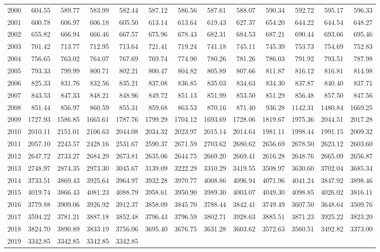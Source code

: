 \begin{longtable}{rrrrrrrrrrrrr}
  2000 & 604.55 & 589.77 & 583.99 & 582.44 & 587.12 & 586.56 & 587.61 & 588.07 & 590.34 & 592.72 & 595.17 & 596.33 \\ 
  2001 & 600.78 & 606.97 & 606.18 & 605.50 & 613.14 & 613.64 & 619.43 & 627.37 & 654.20 & 644.22 & 644.54 & 648.27 \\ 
  2002 & 655.82 & 666.94 & 666.46 & 667.57 & 675.96 & 678.43 & 682.31 & 684.53 & 687.21 & 690.44 & 693.66 & 695.46 \\ 
  2003 & 701.42 & 713.77 & 712.95 & 713.64 & 721.41 & 719.24 & 741.18 & 745.11 & 745.39 & 753.73 & 754.69 & 752.83 \\ 
  2004 & 756.65 & 763.02 & 764.07 & 767.69 & 769.74 & 774.90 & 780.26 & 781.26 & 786.03 & 791.92 & 793.51 & 787.98 \\ 
  2005 & 793.33 & 799.99 & 800.71 & 802.21 & 800.47 & 804.82 & 805.89 & 807.66 & 811.87 & 816.12 & 816.81 & 814.98 \\ 
  2006 & 825.33 & 831.76 & 832.56 & 835.21 & 837.08 & 836.85 & 835.03 & 834.63 & 834.30 & 837.87 & 840.40 & 837.71 \\ 
  2007 & 843.53 & 847.33 & 848.21 & 848.96 & 849.72 & 851.13 & 851.99 & 853.50 & 851.29 & 856.48 & 857.50 & 847.56 \\ 
  2008 & 851.44 & 856.97 & 860.59 & 855.31 & 859.68 & 863.53 & 870.16 & 871.40 & 936.28 & 1142.31 & 1480.84 & 1669.25 \\ 
  2009 & 1727.93 & 1586.85 & 1665.61 & 1787.76 & 1799.29 & 1704.12 & 1693.69 & 1728.06 & 1819.67 & 1975.36 & 2044.51 & 2017.28 \\ 
  2010 & 2010.11 & 2151.01 & 2106.63 & 2044.08 & 2034.32 & 2023.97 & 2015.14 & 2014.64 & 1981.11 & 1998.44 & 1991.15 & 2009.32 \\ 
  2011 & 2057.10 & 2243.57 & 2428.16 & 2531.67 & 2590.37 & 2671.59 & 2703.62 & 2680.62 & 2656.69 & 2678.50 & 2623.12 & 2603.60 \\ 
  2012 & 2647.72 & 2733.27 & 2684.29 & 2673.81 & 2635.06 & 2644.75 & 2669.20 & 2669.41 & 2616.28 & 2648.76 & 2665.09 & 2656.87 \\ 
  2013 & 2748.97 & 2874.35 & 2973.30 & 3045.67 & 3139.09 & 3222.29 & 3310.29 & 3419.55 & 3508.97 & 3630.60 & 3702.04 & 3685.34 \\ 
  2014 & 3733.51 & 3869.43 & 3925.64 & 3964.97 & 3932.28 & 3970.77 & 4008.86 & 4096.94 & 4071.96 & 4041.24 & 3847.92 & 3898.46 \\ 
  2015 & 4019.74 & 3866.43 & 4081.23 & 4088.79 & 3958.61 & 3950.90 & 3989.30 & 4003.07 & 4049.30 & 4098.85 & 4026.02 & 3816.11 \\ 
  2016 & 3779.88 & 3909.06 & 3926.92 & 3912.37 & 3858.09 & 3845.70 & 3788.44 & 3842.41 & 3749.49 & 3607.50 & 3648.64 & 3509.76 \\ 
  2017 & 3594.22 & 3781.21 & 3887.18 & 3852.48 & 3796.43 & 3796.59 & 3802.71 & 3928.63 & 3885.51 & 3871.23 & 3925.22 & 3823.20 \\ 
  2018 & 3824.70 & 3890.89 & 3833.19 & 3756.06 & 3695.40 & 3676.75 & 3631.28 & 3603.62 & 3572.63 & 3560.51 & 3492.82 & 3373.00 \\ 
  2019 & 3342.85 & 3342.85 & 3342.85 & 3342.85 &  &  &  &  &  &  &  &  \\ 
   \hline
\hline
\end{longtable}
